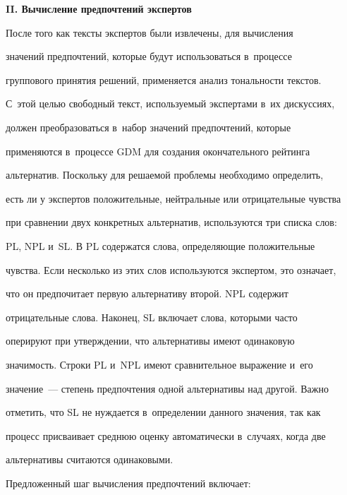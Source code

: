   


  \textbf{II. Вычисление предпочтений экспертов}


  


  После того как тексты экспертов были извлечены, для вычисления 


значений предпочтений, которые будут использоваться в~процессе 


группового принятия решений, применяется анализ тональности текстов. 


С~этой целью свободный текст, используемый экспертами в~их дискуссиях, 


должен преобразоваться в~набор значений предпочтений, которые 


применяются в~процессе GDM для создания окончательного рейтинга 


альтернатив. Поскольку для решаемой проблемы необходимо определить, 


есть ли у экспертов положительные, нейтральные или отрицательные чувства 


при сравнении двух конкретных альтернатив, используются три списка слов: 


PL, NPL и~SL. В PL содержатся слова, определяющие положительные 


чувства. Если несколько из этих слов используются экспертом, это означает, 


что он предпочитает первую альтернативу второй. NPL содержит 


отрицательные слова. Наконец, SL включает слова, которыми часто 


оперируют при утверждении, что альтернативы имеют одинаковую 


значимость. Строки PL и~NPL имеют сравнительное выражение и~его 


значение~--- степень предпочтения одной альтернативы над другой. Важно 


отметить, что SL не нуждается в~определении данного значения, так как 


процесс присваивает среднюю оценку автоматически в~случаях, когда две 


альтернативы считаются одинаковыми.


  


  Предложенный шаг вычисления предпочтений включает:


